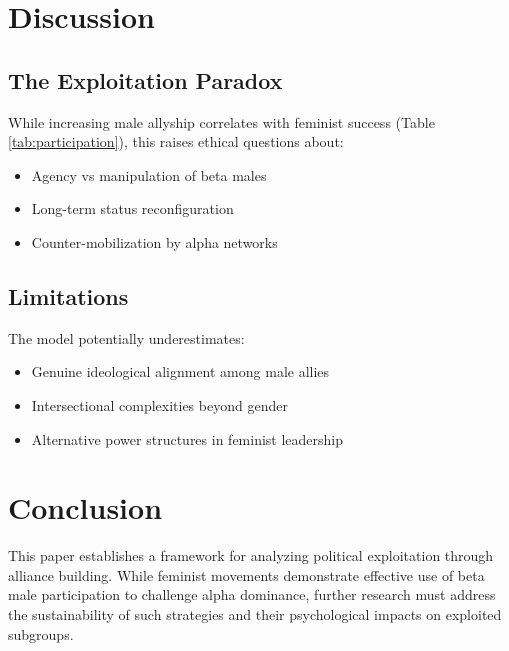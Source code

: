 \documentclass[a4paper,11pt]{article}
\begin{document}
\section{Discussion}
\subsection{The Exploitation Paradox}
While increasing male allyship correlates with feminist success (Table \ref{tab:participation}), this raises ethical questions about:
\begin{itemize}
    \item Agency vs manipulation of beta males
    \item Long-term status reconfiguration
    \item Counter-mobilization by alpha networks
\end{itemize}

\subsection{Limitations}
The model potentially underestimates:
\begin{itemize}
    \item Genuine ideological alignment among male allies
    \item Intersectional complexities beyond gender
    \item Alternative power structures in feminist leadership
\end{itemize}

\section{Conclusion}
This paper establishes a framework for analyzing political exploitation through alliance building. While feminist movements demonstrate effective use of beta male participation to challenge alpha dominance, further research must address the sustainability of such strategies and their psychological impacts on exploited subgroups.

  

\end{document}

